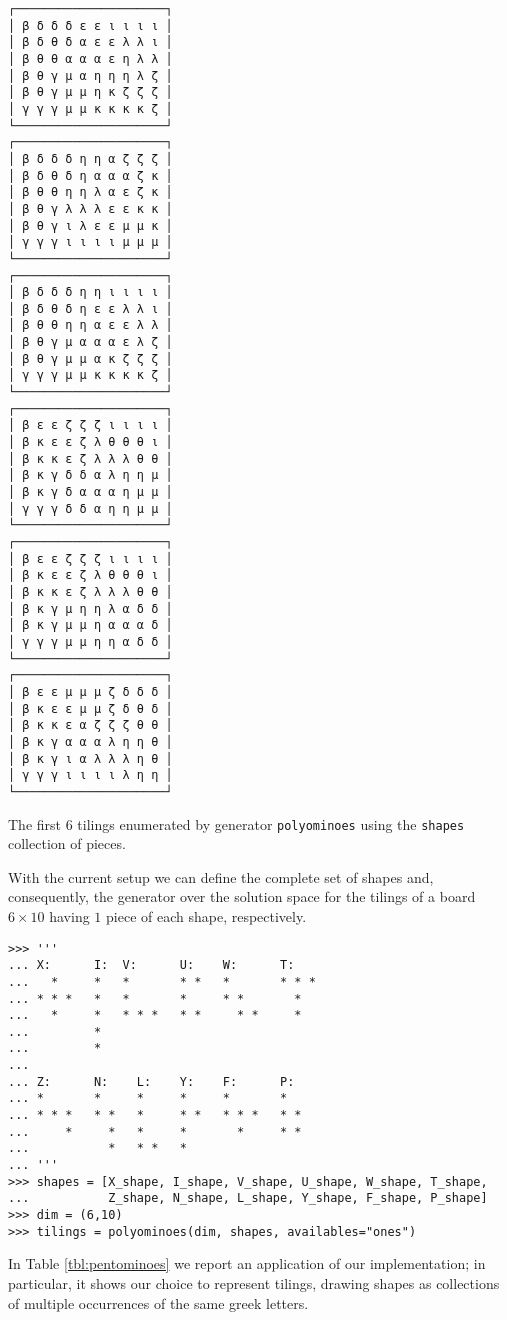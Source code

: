 \begin{margintable}
\inputminted[baselinestretch=0.8]
    {python}{backtracking/pentominoes-regular-snippet.py}
\begin{Verbatim}[baselinestretch=0.1]
┌─────────────────────┐
│ β δ δ δ ε ε ι ι ι ι │
│ β δ θ δ α ε ε λ λ ι │
│ β θ θ α α α ε η λ λ │
│ β θ γ μ α η η η λ ζ │
│ β θ γ μ μ η κ ζ ζ ζ │
│ γ γ γ μ μ κ κ κ κ ζ │
└─────────────────────┘
┌─────────────────────┐
│ β δ δ δ η η α ζ ζ ζ │
│ β δ θ δ η α α α ζ κ │
│ β θ θ η η λ α ε ζ κ │
│ β θ γ λ λ λ ε ε κ κ │
│ β θ γ ι λ ε ε μ μ κ │
│ γ γ γ ι ι ι ι μ μ μ │
└─────────────────────┘
┌─────────────────────┐
│ β δ δ δ η η ι ι ι ι │
│ β δ θ δ η ε ε λ λ ι │
│ β θ θ η η α ε ε λ λ │
│ β θ γ μ α α α ε λ ζ │
│ β θ γ μ μ α κ ζ ζ ζ │
│ γ γ γ μ μ κ κ κ κ ζ │
└─────────────────────┘
┌─────────────────────┐
│ β ε ε ζ ζ ζ ι ι ι ι │
│ β κ ε ε ζ λ θ θ θ ι │
│ β κ κ ε ζ λ λ λ θ θ │
│ β κ γ δ δ α λ η η μ │
│ β κ γ δ α α α η μ μ │
│ γ γ γ δ δ α η η μ μ │
└─────────────────────┘
┌─────────────────────┐
│ β ε ε ζ ζ ζ ι ι ι ι │
│ β κ ε ε ζ λ θ θ θ ι │
│ β κ κ ε ζ λ λ λ θ θ │
│ β κ γ μ η η λ α δ δ │
│ β κ γ μ μ η α α α δ │
│ γ γ γ μ μ η η α δ δ │
└─────────────────────┘
┌─────────────────────┐
│ β ε ε μ μ μ ζ δ δ δ │
│ β κ ε ε μ μ ζ δ θ δ │
│ β κ κ ε α ζ ζ ζ θ θ │
│ β κ γ α α α λ η η θ │
│ β κ γ ι α λ λ λ η θ │
│ γ γ γ ι ι ι ι λ η η │
└─────────────────────┘
\end{Verbatim}
\caption{The first $6$ tilings enumerated by generator \texttt{polyominoes}
using the \texttt{shapes} collection of pieces.}
\label{tbl:pentominoes}
\end{margintable}
With the current setup we can define the complete set of shapes and,
consequently, the generator over the solution space for the tilings of a board
$6\times 10$ having $1$ piece of each shape, respectively.
\begin{verbatim}
>>> '''
... X:      I:  V:      U:    W:      T:
...   *     *   *       * *   *       * * *
... * * *   *   *       *     * *       *
...   *     *   * * *   * *     * *     *
...         *
...         *
...
... Z:      N:    L:    Y:    F:      P:
... *       *     *     *     *       *
... * * *   * *   *     * *   * * *   * *
...     *     *   *     *       *     * *
...           *   * *   *
... '''
>>> shapes = [X_shape, I_shape, V_shape, U_shape, W_shape, T_shape,
...           Z_shape, N_shape, L_shape, Y_shape, F_shape, P_shape]
>>> dim = (6,10)
>>> tilings = polyominoes(dim, shapes, availables="ones")
\end{verbatim}
In Table \ref{tbl:pentominoes} we report an application of our implementation;
in particular, it shows our choice to represent tilings, drawing shapes as
collections of multiple occurrences of the same greek letters.


